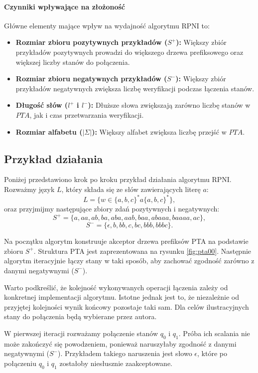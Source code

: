 \paragraph*{Czynniki wpływające na złożoność}
Główne elementy mające wpływ na wydajność algorytmu RPNI to:
\begin{itemize}
    \item \textbf{Rozmiar zbioru pozytywnych przykładów (\( S^+ \)):} Większy zbiór przykładów pozytywnych prowadzi do większego drzewa prefiksowego oraz większej liczby stanów do połączenia.
    \item \textbf{Rozmiar zbioru negatywnych przykładów (\( S^- \)):} Większy zbiór przykładów negatywnych zwiększa liczbę weryfikacji podczas łączenia stanów.
    \item \textbf{Długość słów ($l^+$ i $l^-$):} Dłuższe słowa zwiększają zarówno liczbę stanów w \( PTA \), jak i czas przetwarzania weryfikacji.
    \item \textbf{Rozmiar alfabetu (\( |\Sigma| \)):} Większy alfabet zwiększa liczbę przejść w \( PTA \).
\end{itemize}

\subsection{Przykład działania}

Poniżej przedstawiono krok po kroku przykład działania algorytmu RPNI. Rozważmy język $L$, który składa się ze słów zawierających literę $a$: 
\[
L = \{ w \in \{a, b, c\}^*a\{a, b, c\}^* \},
\]
oraz przyjmijmy następujące zbiory zdań pozytywnych i negatywnych:
\[
S^+ = \{ a, aa, ab, ba, aba, aab, baa, abaaa, baaaa, ac \},
\]
\[
S^- = \{ \epsilon, b, bb, c, bc, bbb, bbbc \}.
\]

Na początku algorytm konstruuje akceptor drzewa prefiksów PTA na podstawie zbioru \( S^+ \). Struktura PTA jest zaprezentowana na rysunku \ref{fig:pta00}. Następnie algorytm iteracyjnie łączy stany w taki sposób, aby zachować zgodność zarówno z danymi negatywnymi (\( S^- \)). 

Warto podkreślić, że kolejność wykonywanych operacji łączenia zależy od konkretnej implementacji algorytmu. Istotne jednak jest to, że niezależnie od przyjętej kolejności wynik końcowy pozostaje taki sam. Dla celów ilustracyjnych stany do połączenia będą wybierane przez autora.

W pierwszej iteracji rozważamy połączenie stanów \( q_0 \) i \( q_1 \). Próba ich scalania nie może zakończyć się powodzeniem, ponieważ naruszyłaby zgodność z danymi negatywnymi (\( S^- \)). Przykładem takiego naruszenia jest słowo \( \epsilon \), które po połączeniu \( q_0 \) i \( q_1 \) zostałoby niesłusznie zaakceptowane. 

